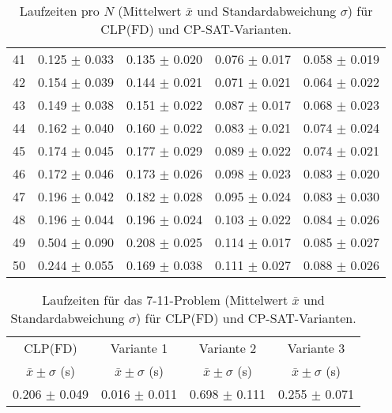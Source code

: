 \documentclass[12pt,a4paper]{article}
\begin{document}
\begin{table}[H]
\begin{tabular}{rcccc}
41 & 0.125 $\pm$ 0.033 & 0.135 $\pm$ 0.020 & 0.076 $\pm$ 0.017 & 0.058 $\pm$ 0.019 \\
42 & 0.154 $\pm$ 0.039 & 0.144 $\pm$ 0.021 & 0.071 $\pm$ 0.021 & 0.064 $\pm$ 0.022 \\
43 & 0.149 $\pm$ 0.038 & 0.151 $\pm$ 0.022 & 0.087 $\pm$ 0.017 & 0.068 $\pm$ 0.023 \\
44 & 0.162 $\pm$ 0.040 & 0.160 $\pm$ 0.022 & 0.083 $\pm$ 0.021 & 0.074 $\pm$ 0.024 \\
45 & 0.174 $\pm$ 0.045 & 0.177 $\pm$ 0.029 & 0.089 $\pm$ 0.022 & 0.074 $\pm$ 0.021 \\
46 & 0.172 $\pm$ 0.046 & 0.173 $\pm$ 0.026 & 0.098 $\pm$ 0.023 & 0.083 $\pm$ 0.020 \\
47 & 0.196 $\pm$ 0.042 & 0.182 $\pm$ 0.028 & 0.095 $\pm$ 0.024 & 0.083 $\pm$ 0.030 \\
48 & 0.196 $\pm$ 0.044 & 0.196 $\pm$ 0.024 & 0.103 $\pm$ 0.022 & 0.084 $\pm$ 0.026 \\
49 & 0.504 $\pm$ 0.090 & 0.208 $\pm$ 0.025 & 0.114 $\pm$ 0.017 & 0.085 $\pm$ 0.027 \\
50 & 0.244 $\pm$ 0.055 & 0.169 $\pm$ 0.038 & 0.111 $\pm$ 0.027 & 0.088 $\pm$ 0.026 \\
\bottomrule
\end{tabular}
\caption{Laufzeiten pro $N$ (Mittelwert $\bar{x}$ und Standardabweichung $\sigma$) für CLP(FD) und CP-SAT-Varianten.}
\label{tab:benchmark-nqueens}
\end{table}

\begin{table}[H]
\centering
\small
\setlength{\tabcolsep}{6pt}
\begin{tabular}{cccc}
\toprule
CLP(FD) & Variante 1 & Variante 2 & Variante 3 \\
$\bar{x} \pm \sigma$ (s) & $\bar{x} \pm \sigma$ (s) & $\bar{x} \pm \sigma$ (s) & $\bar{x} \pm \sigma$ (s) \\
\midrule
0.206 $\pm$ 0.049 & 0.016 $\pm$ 0.011 & 0.698 $\pm$ 0.111 & 0.255 $\pm$ 0.071 \\
\bottomrule
\end{tabular}
\caption{Laufzeiten für das 7-11-Problem (Mittelwert $\bar{x}$ und Standardabweichung $\sigma$) für CLP(FD) und CP-SAT-Varianten.}
\label{tab:benchmark-711}
\end{table}
\captionsetup[lstlisting]{justification=raggedright,singlelinecheck=false}
\end{document}
